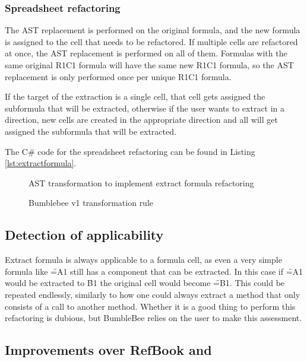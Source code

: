 \subsubsection{Spreadsheet refactoring}

The AST replacement is performed on the original formula, and the new formula is assigned to the cell that needs to be refactored.
If multiple cells are refactored at once, the AST replacement is performed on all of them.
Formulas with the same original R1C1 formula will have the same new R1C1 formula, so the AST replacement is only performed once per unique R1C1 formula.

If the target of the extraction is a single cell, that cell gets assigned the subformula that will be extracted, otherwise if the user wants to extract in a direction, new cells are created in the appropriate direction and all will get assigned the subformula that will be extracted.

The C\# code for the spreadsheet refactoring can be found in Listing \ref{lst:extractformula}.

\begin{figure}
	\centering
	
	\caption{AST transformation to implement extract formula refactoring}
	\label{fig:extractformulaASTtransformations}
\end{figure}

\begin{figure}
	\centering
	
	\caption{Bumblebee v1 transformation rule}
	\label{fig:bbv1transformationrule}
\end{figure}

\newpage

\subsection{Detection of applicability}

Extract formula is always applicable to a formula cell, as even a very simple formula like \f{=A1} still has a component that can be extracted.
In this case if \f{=A1} would be extracted to \f{B1} the original cell would become \f{=B1}.
This could be repeated endlessly, similarly to how one could always extract a method that only consists of a call to another method.
Whether it is a good thing to perform this refactoring is dubious, but BumbleBee relies on the user to make this assessment.

\subsection{Improvements over RefBook  and }
\label{subsubsec:improvementsextractformula}

